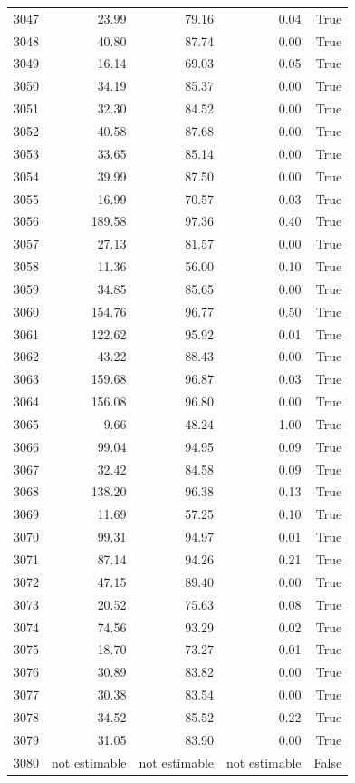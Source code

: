 \begin{longtable}{rrrrr}
3047 & 23.99 & 79.16 & 0.04 & True \\
3048 & 40.80 & 87.74 & 0.00 & True \\
3049 & 16.14 & 69.03 & 0.05 & True \\
3050 & 34.19 & 85.37 & 0.00 & True \\
3051 & 32.30 & 84.52 & 0.00 & True \\
3052 & 40.58 & 87.68 & 0.00 & True \\
3053 & 33.65 & 85.14 & 0.00 & True \\
3054 & 39.99 & 87.50 & 0.00 & True \\
3055 & 16.99 & 70.57 & 0.03 & True \\
3056 & 189.58 & 97.36 & 0.40 & True \\
3057 & 27.13 & 81.57 & 0.00 & True \\
3058 & 11.36 & 56.00 & 0.10 & True \\
3059 & 34.85 & 85.65 & 0.00 & True \\
3060 & 154.76 & 96.77 & 0.50 & True \\
3061 & 122.62 & 95.92 & 0.01 & True \\
3062 & 43.22 & 88.43 & 0.00 & True \\
3063 & 159.68 & 96.87 & 0.03 & True \\
3064 & 156.08 & 96.80 & 0.00 & True \\
3065 & 9.66 & 48.24 & 1.00 & True \\
3066 & 99.04 & 94.95 & 0.09 & True \\
3067 & 32.42 & 84.58 & 0.09 & True \\
3068 & 138.20 & 96.38 & 0.13 & True \\
3069 & 11.69 & 57.25 & 0.10 & True \\
3070 & 99.31 & 94.97 & 0.01 & True \\
3071 & 87.14 & 94.26 & 0.21 & True \\
3072 & 47.15 & 89.40 & 0.00 & True \\
3073 & 20.52 & 75.63 & 0.08 & True \\
3074 & 74.56 & 93.29 & 0.02 & True \\
3075 & 18.70 & 73.27 & 0.01 & True \\
3076 & 30.89 & 83.82 & 0.00 & True \\
3077 & 30.38 & 83.54 & 0.00 & True \\
3078 & 34.52 & 85.52 & 0.22 & True \\
3079 & 31.05 & 83.90 & 0.00 & True \\
3080 & not estimable & not estimable & not estimable & False \\

\end{longtable}
